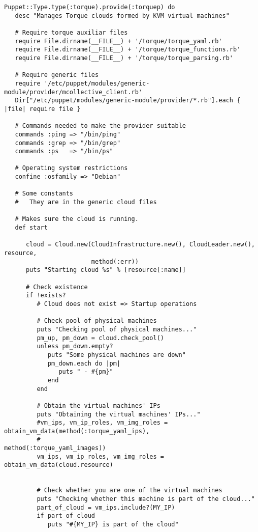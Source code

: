 \begin{lstlisting}
Puppet::Type.type(:torque).provide(:torquep) do
   desc "Manages Torque clouds formed by KVM virtual machines"

   # Require torque auxiliar files
   require File.dirname(__FILE__) + '/torque/torque_yaml.rb'
   require File.dirname(__FILE__) + '/torque/torque_functions.rb'
   require File.dirname(__FILE__) + '/torque/torque_parsing.rb'
   
   # Require generic files
   require '/etc/puppet/modules/generic-module/provider/mcollective_client.rb'
   Dir["/etc/puppet/modules/generic-module/provider/*.rb"].each { |file| require file }

   # Commands needed to make the provider suitable
   commands :ping => "/bin/ping"
   commands :grep => "/bin/grep"
   commands :ps   => "/bin/ps"
   
   # Operating system restrictions
   confine :osfamily => "Debian"

   # Some constants
   #   They are in the generic cloud files

   # Makes sure the cloud is running.
   def start

      cloud = Cloud.new(CloudInfrastructure.new(), CloudLeader.new(), resource,
                        method(:err))
      puts "Starting cloud %s" % [resource[:name]]
      
      # Check existence
      if !exists?
         # Cloud does not exist => Startup operations
         
         # Check pool of physical machines
         puts "Checking pool of physical machines..."
         pm_up, pm_down = cloud.check_pool()
         unless pm_down.empty?
            puts "Some physical machines are down"
            pm_down.each do |pm|
               puts " - #{pm}"
            end
         end
         
         # Obtain the virtual machines' IPs
         puts "Obtaining the virtual machines' IPs..."
         #vm_ips, vm_ip_roles, vm_img_roles = obtain_vm_data(method(:torque_yaml_ips),
         #                                                   method(:torque_yaml_images))
         vm_ips, vm_ip_roles, vm_img_roles = obtain_vm_data(cloud.resource)
         
         
         # Check whether you are one of the virtual machines
         puts "Checking whether this machine is part of the cloud..."
         part_of_cloud = vm_ips.include?(MY_IP)
         if part_of_cloud
            puts "#{MY_IP} is part of the cloud"
            

\end{lstlisting}
